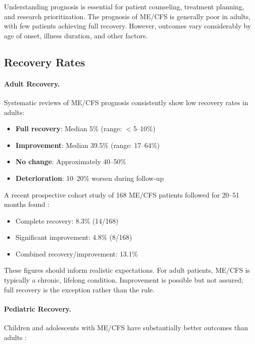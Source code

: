 
Understanding prognosis is essential for patient counseling, treatment planning, and research prioritization. The prognosis of ME/CFS is generally poor in adults, with few patients achieving full recovery. However, outcomes vary considerably by age of onset, illness duration, and other factors.

\subsection{Recovery Rates}

\paragraph{Adult Recovery.}
Systematic reviews of ME/CFS prognosis consistently show low recovery rates in adults:
\begin{itemize}
    \item \textbf{Full recovery}: Median 5\% (range: $<$5--10\%)
    \item \textbf{Improvement}: Median 39.5\% (range: 17--64\%)
    \item \textbf{No change}: Approximately 40--50\%
    \item \textbf{Deterioration}: 10--20\% worsen during follow-up
\end{itemize}

A recent prospective cohort study of 168 ME/CFS patients followed for 20--51 months found \cite{Lacourt2022prognosis}:
\begin{itemize}
    \item Complete recovery: 8.3\% (14/168)
    \item Significant improvement: 4.8\% (8/168)
    \item Combined recovery/improvement: 13.1\%
\end{itemize}

These figures should inform realistic expectations. For adult patients, ME/CFS is typically a chronic, lifelong condition. Improvement is possible but not assured; full recovery is the exception rather than the rule.

\paragraph{Pediatric Recovery.}
Children and adolescents with ME/CFS have substantially better outcomes than adults \cite{Rowe2019pediatric}:

